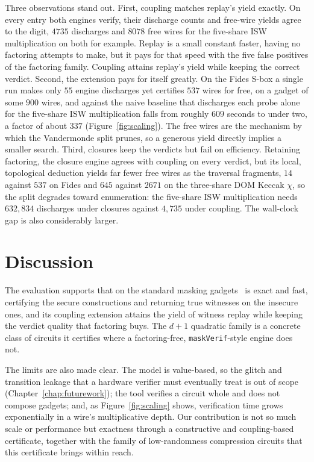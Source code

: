   Three observations stand out. First, coupling matches replay's yield exactly. On every
  entry both engines verify, their discharge counts and free-wire yields agree to the
  digit, $4735$ discharges and $8078$ free wires for the five-share ISW
  multiplication on both for example. Replay is a small constant faster, having no factoring
  attempts to make, but it pays for that speed with the five false positives of the
  factoring family. Coupling attains replay's yield while keeping the correct
  verdict. Second, the extension pays for itself greatly. On the Fides S-box a
  single run makes only $55$ engine discharges yet certifies $537$ wires for free, on
  a gadget of some $900$ wires, and against the naive baseline that discharges each
  probe alone for the five-share ISW multiplication falls from roughly $609$ seconds to
  under two, a factor of about $337$ (Figure~\ref{fig:scaling}). The free wires are
  the mechanism by which the Vandermonde split prunes, so a generous yield
  directly implies a smaller search. Third, closures keep the verdicts but fail on efficiency.
  Retaining factoring, the closure engine agrees with coupling on every verdict, but
  its local, topological deduction yields far fewer free wires as the traversal
  fragments, $14$ against $537$ on Fides and $645$ against $2671$ on the three-share
  DOM Keccak $\chi$, so the split degrades toward enumeration: the five-share ISW
  multiplication needs $632{,}834$ discharges under closures against $4{,}735$ under
  coupling. The wall-clock gap is also considerably larger.

\section{Discussion}
\label{sec:eval-discussion}

The evaluation supports that on the standard masking gadgets
\toolname\ is exact and fast, certifying the secure constructions and returning true
witnesses on the insecure ones, and its coupling extension attains the yield of
witness replay while keeping the verdict quality that factoring buys. The $d{+}1$
quadratic family is a concrete class of circuits it certifies where a factoring-free,
\texttt{maskVerif}-style engine does not.

The limits are also made clear. The model is value-based, so the
glitch and transition leakage that a hardware verifier must eventually treat is out
of scope (Chapter~\ref{chap:futurework}); the tool verifies a circuit whole and does
not compose gadgets; and, as Figure~\ref{fig:scaling} shows, verification time grows
exponentially in a wire's multiplicative depth. Our contribution
is not so much scale or performance but exactness through a constructive and coupling-based
certificate, together
with the family of low-randomness compression circuits that this certificate brings within reach.
